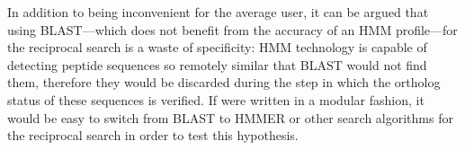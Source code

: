 In addition to \hamstr being inconvenient for the average user, it can be argued
that using BLAST---which does not benefit from the accuracy of an HMM
profile---for the reciprocal search is a waste of specificity: HMM technology is
capable of detecting peptide sequences so remotely similar that BLAST would not
find them, therefore they would be discarded during the step in which the
ortholog status of these sequences is verified. If \hamstr were written in a
modular fashion, it would be easy to switch from BLAST to HMMER or other search
algorithms for the reciprocal search in order to test this hypothesis. 
